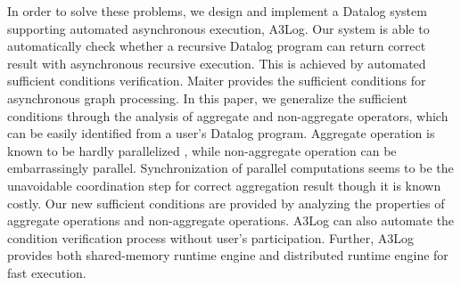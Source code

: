 In order to solve these problems, we design and implement a Datalog system supporting automated asynchronous execution, A3Log. Our system is able to automatically check whether a recursive Datalog program can return correct result with asynchronous recursive execution. This is achieved by automated sufficient conditions verification. Maiter \cite{} provides the sufficient conditions for asynchronous graph processing. In this paper, we generalize the sufficient conditions through the analysis of aggregate and non-aggregate operators, which can be easily identified from a user's Datalog program. Aggregate operation is known to be hardly parallelized \cite{distribute aggregate from ms}, while non-aggregate operation can be embarrassingly parallel. Synchronization of parallel computations seems to be the unavoidable coordination step for correct aggregation result though it is known costly. Our new sufficient conditions are provided by analyzing the properties of aggregate operations and non-aggregate operations. A3Log can also automate the condition verification process without user's participation. Further, A3Log provides both shared-memory runtime engine and distributed runtime engine for fast execution.


